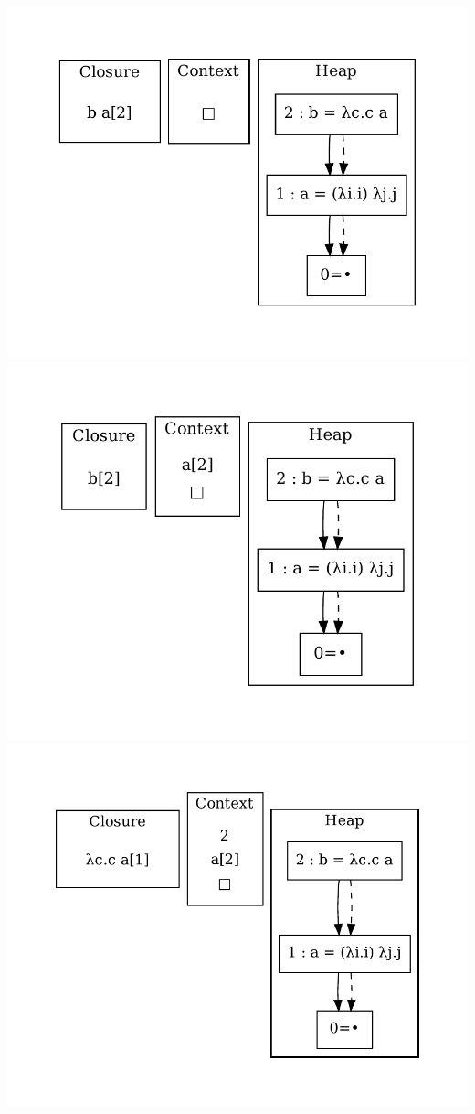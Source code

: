 \includegraphics[width=0.99\linewidth/2]{figures/5.pdf}
\includegraphics[width=0.99\linewidth/2]{figures/6.pdf}
\includegraphics[width=0.99\linewidth/2]{figures/7.pdf}
